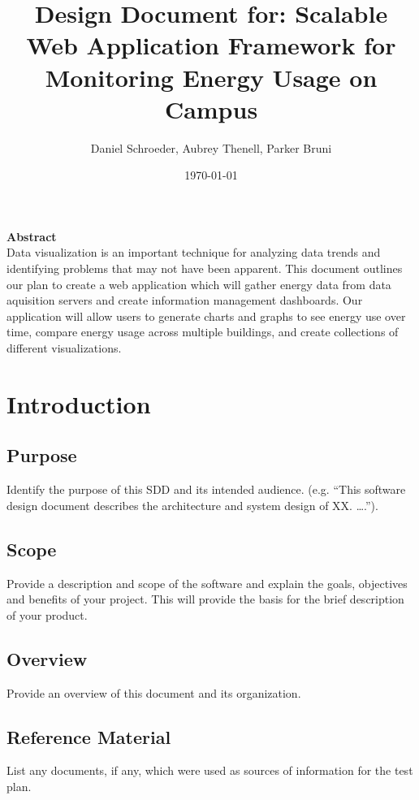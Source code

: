 \documentclass[journal,10pt,onecolumn,compsoc]{IEEEtran}
\title{Design Document for: \linebreak Scalable Web Application Framework for Monitoring Energy Usage on Campus}
\author{Daniel Schroeder, Aubrey Thenell, Parker Bruni}
\date{\today}
\begin{document}
    \maketitle
    \vspace{2cm}
    \noindent \textbf{Abstract} \\
                \indent 
                Data visualization is an important technique for analyzing data trends and identifying problems that may not have been apparent. This document outlines our plan to create a web application which will gather energy data from data aquisition servers and create information management dashboards. Our application will allow users to generate charts and graphs to see energy use over time, compare energy usage across multiple buildings, and create collections of different visualizations.
                
                
    
    \newpage
    \tableofcontents
    \clearpage
    
    \section{Introduction}
    \subsection{Purpose}
    Identify the purpose of this SDD and its intended audience. (e.g. “This software
    design document describes the architecture and system design of XX. ….”).
    \subsection{Scope}
    Provide a description and scope of the software and explain the goals, objectives and
    benefits of your project. This will provide the basis for the brief description of your
    product.
    \subsection{Overview}
    Provide an overview of this document and its organization.
    \subsection{Reference Material}
    List any documents, if any, which were used as sources of information for the test plan.
\end{document}
